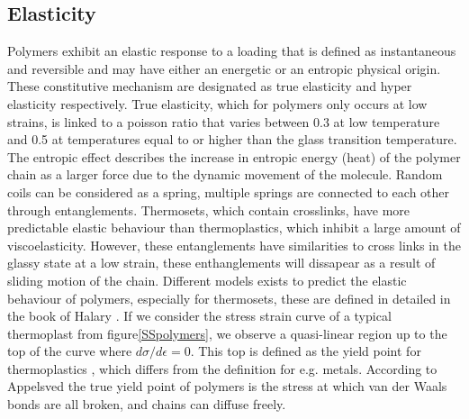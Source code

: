 \subsection{Elasticity}
Polymers exhibit an elastic response to a loading that is defined as instantaneous and reversible and may have either an energetic or an entropic physical origin. These constitutive mechanism are designated as true elasticity and hyper elasticity respectively. True elasticity, which for polymers only occurs at low strains, is linked to a poisson ratio that varies between 0.3 at low temperature and 0.5 at temperatures equal to or higher than the glass transition temperature. 
The entropic effect describes the increase in entropic energy (heat) of the polymer chain as a larger force due to the dynamic movement of the molecule. 
Random coils can be considered as a spring, multiple springs are connected to each other through entanglements. Thermosets, which contain crosslinks, have more predictable elastic behaviour than thermoplastics, which inhibit a large amount of viscoelasticity. However, these entanglements have similarities to cross links in the glassy state at a low strain, these enthanglements will dissapear as a result of sliding motion of the chain. Different models exists to predict the elastic behaviour of polymers, especially for thermosets, these are defined in detailed in the book of Halary \cite{Halary2011PolymerMaterials}. If we consider the stress strain curve of a typical thermoplast from figure\ref{SSpolymers}, we observe a quasi-linear region up to the top of the curve where $d\sigma/d\epsilon=0$. This top is defined as the yield point for thermoplastics \cite{Afd2016NEN-EN-ISO527-2}, which differs from the definition for e.g. metals. According to Appelsved \cite{Appelsved2012InvestigationModels} the true yield point of polymers is the stress at which van der Waals bonds are all broken, and chains can diffuse freely.  


